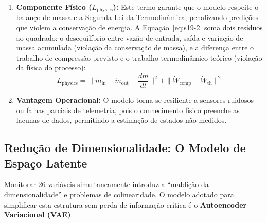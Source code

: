 \documentclass[12pt,a4paper]{article}
\numberwithin{equation}{section}
\numberwithin{table}{section}
\numberwithin{figure}{section}
\begin{document}
{\begin{enumerate}
	\item \textbf{Componente Físico ($L_{\text{physics}}$):}
	Este termo garante que o modelo respeite o balanço de massa e a Segunda Lei da Termodinâmica, penalizando predições que violem a conservação de energia. A Equação~\eqref{eq:s19-2} soma dois resíduos ao quadrado: o desequilíbrio entre vazão de entrada, saída e variação de massa acumulada (violação da conservação de massa), e a diferença entre o trabalho de compressão previsto e o trabalho termodinâmico teórico (violação da física do processo):
	\begin{equation}\label{eq:s19-2}
 L_{\text{physics}} = \| \dot{m}_{\text{in}} - \dot{m}_{\text{out}} - \frac{dm}{dt} \|^2 + \| \dot{W}_{\text{comp}} - \dot{W}_{\text{th}} \|^2
\end{equation}
	
	\item \textbf{Vantagem Operacional:}
	O modelo torna-se resiliente a sensores ruidosos ou falhas parciais de telemetria, pois o conhecimento físico preenche as lacunas de dados, permitindo a estimação de estados não medidos.
\end{enumerate}

\subsection{Redução de Dimensionalidade: O Modelo de Espaço Latente}

Monitorar 26 variáveis simultaneamente introduz a ``maldição da dimensionalidade'' e problemas de colinearidade. O modelo adotado para simplificar esta estrutura sem perda de informação crítica é o \textbf{Autoencoder Variacional (VAE)}.

}
\end{document}
